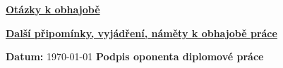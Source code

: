 \documentclass[a4paper,12pt]{article}
\begin{document}
\vskip10pt
\uline{\textbf{Otázky k obhajobě}}
\vskip35pt

\uline{\textbf{Další připomínky, vyjádření, náměty k obhajobě práce}}
\vskip45pt

\textbf{Datum:} \quad \today
\vskip10pt
\hfill \textbf{Podpis oponenta diplomové práce}

    
\end{document}
